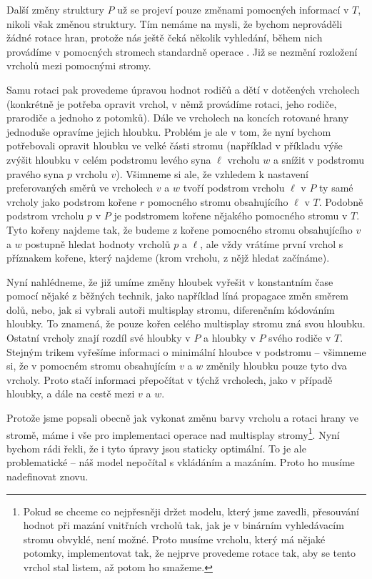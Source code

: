 Další změny struktury $P$ už se projeví pouze změnami pomocných informací v
$T$, nikoli však změnou struktury. Tím nemáme na mysli, že bychom neprováděli
žádné rotace hran, protože nás ještě čeká několik vyhledání, během nich
provádíme v pomocných stromech standardně operace . Již se nezmění
rozložení vrcholů mezi pomocnými stromy.

Samu rotaci pak provedeme úpravou hodnot rodičů a dětí v dotčených vrcholech
(konkrétně je potřeba opravit vrchol, v němž provádíme rotaci, jeho rodiče,
prarodiče a jednoho z potomků). Dále ve vrcholech na koncích rotované hrany
jednoduše opravíme jejich hloubku. Problém je ale v tom, že nyní bychom
potřebovali opravit hloubku ve velké části stromu (například v příkladu výše
zvýšit hloubku v celém podstromu levého syna $\ell$ vrcholu $w$ a snížit v
podstromu pravého syna $p$ vrcholu $v$). Všimneme si ale, že vzhledem k
nastavení preferovaných směrů ve vrcholech $v$ a $w$ tvoří podstrom vrcholu
$\ell$ v $P$ ty samé vrcholy jako podstrom kořene $r$ pomocného stromu
obsahujícího $\ell$ v $T$. Podobně podstrom vrcholu $p$ v $P$ je podstromem
kořene nějakého pomocného stromu v $T$. Tyto kořeny najdeme tak, že budeme z
kořene pomocného stromu obsahujícího $v$ a $w$ postupně hledat hodnoty
vrcholů $p$ a $\ell$, ale vždy vrátíme první vrchol s příznakem kořene, který
najdeme (krom vrcholu, z nějž hledat začínáme).

Nyní nahlédneme, že již umíme změny hloubek vyřešit v konstantním čase pomocí nějaké
z běžných technik, jako například líná propagace změn směrem dolů, nebo, jak si
vybrali autoři multisplay stromu, diferenčním kódováním hloubky. To znamená, že
pouze kořen celého multisplay stromu zná svou hloubku. Ostatní vrcholy znají
rozdíl své hloubky v $P$ a hloubky v $P$ svého rodiče v $T$. Stejným trikem
vyřešíme informaci o minimální hloubce v podstromu -- všimneme si, že v
pomocném stromu obsahujícím $v$ a $w$ změnily hloubku pouze tyto dva vrcholy.
Proto stačí informaci přepočítat v týchž vrcholech, jako v případě hloubky, a
dále na cestě mezi $v$ a $w$.

Protože jsme popsali obecně jak vykonat změnu barvy vrcholu a rotaci hrany ve stromě, máme i vše pro implementaci operace  nad multisplay stromy\footnote{Pokud se chceme co nejpřesněji držet modelu, který jsme zavedli, přesouvání hodnot při mazání vnitřních vrcholů tak, jak je v binárním vyhledávacím stromu obvyklé, není možné. Proto musíme  vrcholu, který má nějaké potomky, implementovat tak, že nejprve provedeme rotace tak, aby se tento vrchol stal listem, až potom ho smažeme.}. Nyní bychom rádi řekli, že i tyto úpravy jsou staticky optimální. To je ale problematické -- náš model nepočítal s vkládáním a mazáním. Proto ho musíme nadefinovat znovu.

